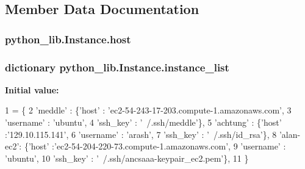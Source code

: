 \subsection{Member Data Documentation}
\hypertarget{classpython__lib_1_1_instance_a313b98cd096f7ec75211979440ea7b12}{
\subsubsection[{host}]{\setlength{\rightskip}{0pt plus 5cm}python\-\_\-lib.\-Instance.\-host}}\label{classpython__lib_1_1_instance_a313b98cd096f7ec75211979440ea7b12}
\hypertarget{classpython__lib_1_1_instance_a27fea834047432419ffc36fea953b1bb}{
\subsubsection[{instance\-\_\-list}]{\setlength{\rightskip}{0pt plus 5cm}dictionary python\-\_\-lib.\-Instance.\-instance\-\_\-list\hspace{0.3cm}{\ttfamily [static]}}}\label{classpython__lib_1_1_instance_a27fea834047432419ffc36fea953b1bb}
{\bfseries Initial value\-:}
\begin{DoxyCode}
1 = \{
2                      \textcolor{stringliteral}{'meddle'}  : \{\textcolor{stringliteral}{'host'}     : \textcolor{stringliteral}{'ec2-54-243-17-203.compute-1.amazonaws.com'},
3                                   \textcolor{stringliteral}{'username'} : \textcolor{stringliteral}{'ubuntu'},
4                                   \textcolor{stringliteral}{'ssh\_key'}  : \textcolor{stringliteral}{'~/.ssh/meddle'}\},
5                      \textcolor{stringliteral}{'achtung'} : \{\textcolor{stringliteral}{'host'}     :\textcolor{stringliteral}{'129.10.115.141'},
6                                   \textcolor{stringliteral}{'username'} : \textcolor{stringliteral}{'arash'},
7                                   \textcolor{stringliteral}{'ssh\_key'}  : \textcolor{stringliteral}{'~/.ssh/id\_rsa'}\},
8                      \textcolor{stringliteral}{'alan-ec2'}: \{\textcolor{stringliteral}{'host'}     :\textcolor{stringliteral}{'ec2-54-204-220-73.compute-1.amazonaws.com'},
9                                   \textcolor{stringliteral}{'username'} : \textcolor{stringliteral}{'ubuntu'},
10                                   \textcolor{stringliteral}{'ssh\_key'}  : \textcolor{stringliteral}{'~/.ssh/ancsaaa-keypair\_ec2.pem'}\},
11                      \}
\end{DoxyCode}
